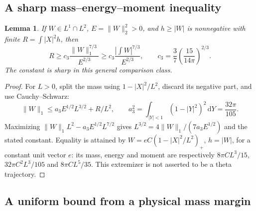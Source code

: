 \documentclass[11pt]{article}
\numberwithin{equation}{section}
\newtheorem{lemma}[theorem]{Lemma}
\newcommand{\dd}{\,\mathrm d}
\begin{document}
\subsection{A sharp mass--energy--moment inequality}

\begin{lemma}\label{lem:carriersharp}
If $W\in L^1\cap L^2$, $E=\|W\|_2^2>0$, and $h\ge|W|$ is
nonnegative with finite $R=\int|X|^2h$, then
\begin{equation}\label{eq:carriersharp}
 R\ge c_3\frac{\|W\|_1^{7/3}}{E^{2/3}}
   \ge c_3\frac{|\int W|^{7/3}}{E^{2/3}},\qquad
 c_3=\frac37\left(\frac{15}{14\pi}\right)^{2/3}.
\end{equation}
The constant is sharp in this general comparison class.
\end{lemma}
\begin{proof}
For $L>0$, split the mass using $1-|X|^2/L^2$, discard its negative
part, and use Cauchy--Schwarz:
\[
 \|W\|_1\le a_3E^{1/2}L^{3/2}+R/L^2,\qquad
 a_3^2=\int_{|Y|<1}(1-|Y|^2)^2\dd Y=\frac{32\pi}{105}.
\]
Maximizing $\|W\|_1L^2-a_3E^{1/2}L^{7/2}$ gives
$L^{3/2}=4\|W\|_1/(7a_3E^{1/2})$ and the stated constant.
Equality is attained by $W=eC(1-|X|^2/L^2)_+$, $h=|W|$, for a
constant unit vector $e$: its mass, energy and moment are respectively
$8\pi CL^3/15$, $32\pi C^2L^3/105$ and $8\pi CL^5/35$.
This extremizer is not asserted to be a theta trajectory.
\end{proof}

\subsection{A uniform bound from a physical mass margin}
\end{document}
